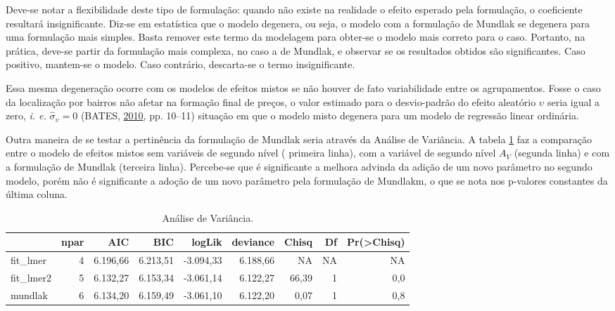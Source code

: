 \documentclass[
  a4paper, 12pt]{article}
\begin{document}
Deve-se notar a flexibilidade deste tipo de formulação: quando não
existe na realidade o efeito esperado pela formulação, o coeficiente
resultará insignificante. Diz-se em estatística que o modelo degenera,
ou seja, o modelo com a formulação de Mundlak se degenera para uma
formulação mais simples. Basta remover este termo da modelagem para
obter-se o modelo mais correto para o caso. Portanto, na prática,
deve-se partir da formulação mais complexa, no caso a de Mundlak, e
observar se os resultados obtidos são significantes. Caso positivo,
mantem-se o modelo. Caso contrário, descarta-se o termo insignificante.

Essa mesma degeneração ocorre com os modelos de efeitos mistos se não
houver de fato variabilidade entre os agrupamentos. Fosse o caso da
localização por bairros não afetar na formação final de preços, o valor
estimado para o desvio-padrão do efeito aleatório \(\upsilon\) seria
igual a zero, \emph{i. e.} \(\hat \sigma_\upsilon = 0\) (BATES,
\protect\hyperlink{ref-Batesbook}{2010}, pp. 10--11) situação em que o
modelo misto degenera para um modelo de regressão linear ordinária.

Outra maneira de se testar a pertinência da formulação de Mundlak seria
através da Análise de Variância. A tabela \ref{tab:anova} faz a
comparação entre o modelo de efeitos mistos sem variáveis de segundo
nível ( primeira linha), com a variável de segundo nível \(A_V\)
(segunda linha) e com a formulação de Mundlak (terceira linha).
Percebe-se que é significante a melhora advinda da adição de um novo
parâmetro no segundo modelo, porém não é significante a adoção de um
novo parâmetro pela formulação de Mundlakm, o que se nota nos p-valores
constantes da última coluna.

\begin{table}

\caption{\label{tab:anova}Análise de Variância.}
\centering
\fontsize{10}{12}\selectfont
\begin{tabular}[t]{lrrrrrrrr}
\toprule
  & npar & AIC & BIC & logLik & deviance & Chisq & Df & Pr(>Chisq)\\
\midrule
\rowcolor{gray!6}  fit\_lmer & 4 & 6.196,66 & 6.213,51 & -3.094,33 & 6.188,66 & NA & NA & NA\\
fit\_lmer2 & 5 & 6.132,27 & 6.153,34 & -3.061,14 & 6.122,27 & 66,39 & 1 & 0,0\\
\rowcolor{gray!6}  mundlak & 6 & 6.134,20 & 6.159,49 & -3.061,10 & 6.122,20 & 0,07 & 1 & 0,8\\
\bottomrule
\end{tabular}
\end{table}
\end{document}
